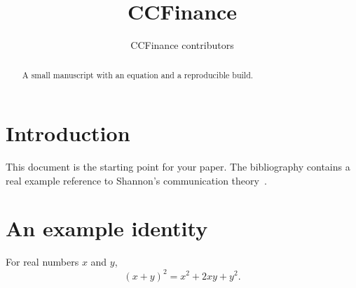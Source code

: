\documentclass{article}
\title{CCFinance}
\author{CCFinance contributors}
\date{}
\begin{document}
\maketitle

\begin{abstract}
  A small manuscript with an equation and a reproducible build.
\end{abstract}

\section{Introduction}

This document is the starting point for your paper.
The bibliography contains a real example reference to Shannon's
communication theory~\citep{shannon1948}.

\section{An example identity}

For real numbers $x$ and $y$,
\begin{equation}
  {(x+y)}^2 = x^2 + 2xy + y^2.
\end{equation}



\end{document}
